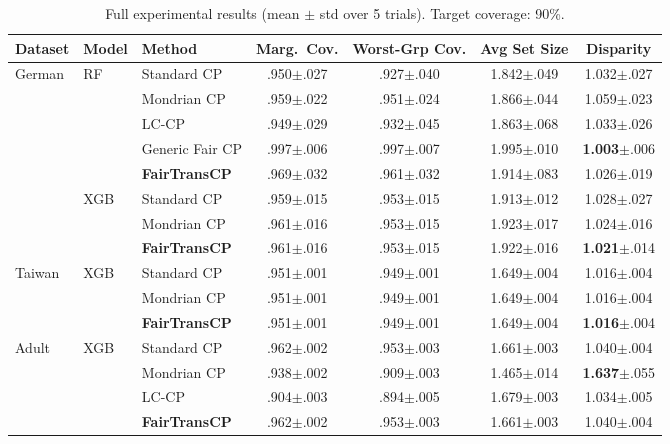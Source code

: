 \documentclass[11pt,a4paper]{article}
\begin{document}
\begin{table}[htbp]
\centering
\footnotesize
\caption{Full experimental results (mean $\pm$ std over 5 trials). Target coverage: 90\%.}
\label{tab:main}
\setlength{\tabcolsep}{4pt}
\begin{tabular}{@{}lllcccc@{}}
\toprule
\textbf{Dataset} & \textbf{Model} & \textbf{Method} & \textbf{Marg.\ Cov.} & \textbf{Worst-Grp Cov.} & \textbf{Avg Set Size} & \textbf{Disparity} \\
\midrule
German & RF & Standard CP & .950$\pm$.027 & .927$\pm$.040 & 1.842$\pm$.049 & 1.032$\pm$.027 \\
& & Mondrian CP & .959$\pm$.022 & .951$\pm$.024 & 1.866$\pm$.044 & 1.059$\pm$.023 \\
& & LC-CP & .949$\pm$.029 & .932$\pm$.045 & 1.863$\pm$.068 & 1.033$\pm$.026 \\
& & Generic Fair CP & .997$\pm$.006 & .997$\pm$.007 & 1.995$\pm$.010 & \textbf{1.003}$\pm$.006 \\
& & \textbf{FairTransCP} & .969$\pm$.032 & .961$\pm$.032 & 1.914$\pm$.083 & 1.026$\pm$.019 \\
\cmidrule{2-7}
& XGB & Standard CP & .959$\pm$.015 & .953$\pm$.015 & 1.913$\pm$.012 & 1.028$\pm$.027 \\
& & Mondrian CP & .961$\pm$.016 & .953$\pm$.015 & 1.923$\pm$.017 & 1.024$\pm$.016 \\
& & \textbf{FairTransCP} & .961$\pm$.016 & .953$\pm$.015 & 1.922$\pm$.016 & \textbf{1.021}$\pm$.014 \\
\midrule
Taiwan & XGB & Standard CP & .951$\pm$.001 & .949$\pm$.001 & 1.649$\pm$.004 & 1.016$\pm$.004 \\
& & Mondrian CP & .951$\pm$.001 & .949$\pm$.001 & 1.649$\pm$.004 & 1.016$\pm$.004 \\
& & \textbf{FairTransCP} & .951$\pm$.001 & .949$\pm$.001 & 1.649$\pm$.004 & \textbf{1.016}$\pm$.004 \\
\midrule
Adult & XGB & Standard CP & .962$\pm$.002 & .953$\pm$.003 & 1.661$\pm$.003 & 1.040$\pm$.004 \\
& & Mondrian CP & .938$\pm$.002 & .909$\pm$.003 & 1.465$\pm$.014 & \textbf{1.637}$\pm$.055 \\
& & LC-CP & .904$\pm$.003 & .894$\pm$.005 & 1.679$\pm$.003 & 1.034$\pm$.005 \\
& & \textbf{FairTransCP} & .962$\pm$.002 & .953$\pm$.003 & 1.661$\pm$.003 & 1.040$\pm$.004 \\
\bottomrule
\end{tabular}
\end{table}
\end{document}
